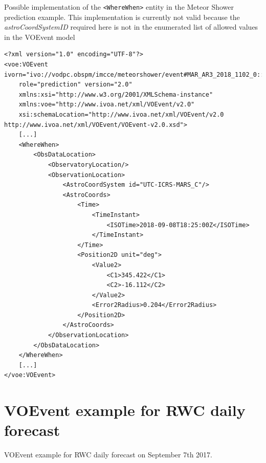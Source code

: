 \documentclass[referee,a4paper,12pt,traditabstract]{swsc}
\begin{document}
\begin{linenumbers}
Possible implementation of the {\tt <WhereWhen>} entity in the Meteor Shower prediction example. This implementation is currently not valid because the \emph{astroCoordSystemID} required here is not in the enumerated list of allowed values in the VOEvent model

{\tiny 
\begin{verbatim}
<?xml version="1.0" encoding="UTF-8"?>
<voe:VOEvent ivorn="ivo://vodpc.obspm/imcce/meteorshower/event#MAR_AR3_2018_1102_0::v1.0"
    role="prediction" version="2.0"
    xmlns:xsi="http://www.w3.org/2001/XMLSchema-instance"
    xmlns:voe="http://www.ivoa.net/xml/VOEvent/v2.0"
    xsi:schemaLocation="http://www.ivoa.net/xml/VOEvent/v2.0 http://www.ivoa.net/xml/VOEvent/VOEvent-v2.0.xsd">
    [...]
    <WhereWhen>
        <ObsDataLocation>
            <ObservatoryLocation/>
            <ObservationLocation>
                <AstroCoordSystem id="UTC-ICRS-MARS_C"/>
                <AstroCoords>
                    <Time>
                        <TimeInstant>
                            <ISOTime>2018-09-08T18:25:00Z</ISOTime>
                        </TimeInstant>
                    </Time>
                    <Position2D unit="deg">
                        <Value2>
                            <C1>345.422</C1>
                            <C2>-16.112</C2>
                        </Value2>
                        <Error2Radius>0.204</Error2Radius>
                    </Position2D>
                </AstroCoords>
            </ObservationLocation>
        </ObsDataLocation>
    </WhereWhen>
    [...]
</voe:VOEvent>
\end{verbatim}
}

\section{VOEvent example for RWC daily forecast}
\label{appendix-xml-voevent-rwc}

VOEvent example for RWC daily forecast on September 7th 2017.


\end{linenumbers}
\end{document}
